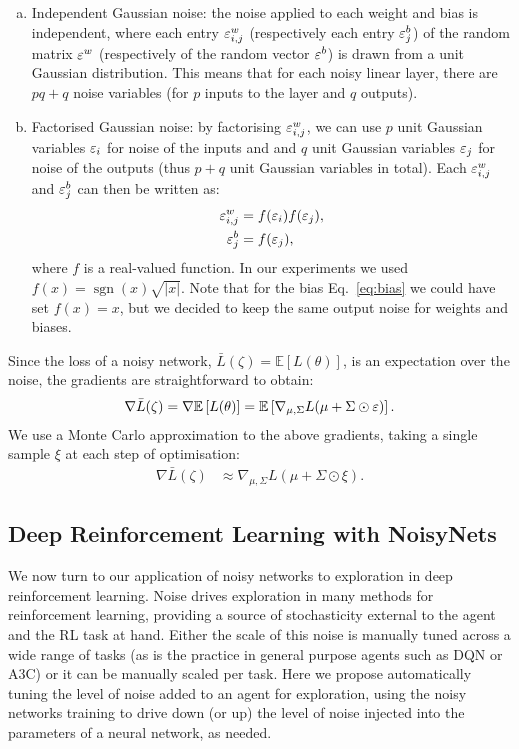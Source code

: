 \documentclass{article}
\newcommand{\sgn}{\operatorname*{sgn}}
\begin{document}
\begin{enumerate}[(a)]
    \item Independent Gaussian noise: the noise applied to each weight and bias is independent, where each entry $\varepsilon^w_{i,j}$ (respectively each entry $\varepsilon^b_j$) of the random matrix $\varepsilon^w$ (respectively of the random vector $\varepsilon^b$) is drawn from a unit Gaussian distribution.
    This means that for each noisy linear layer, there are $pq+q$ noise variables (for $p$ inputs to the layer and $q$ outputs).
    \item Factorised Gaussian noise: by factorising $\varepsilon^w_{i,j}$, we can use $p$ unit Gaussian variables $\varepsilon_i$ for noise of the inputs and
and $q$ unit Gaussian variables $\varepsilon_j$ for noise of the outputs (thus $p+q$ unit Gaussian variables in total). 
Each $\varepsilon^w_{i,j}$ and $\varepsilon^b_j$ can then be written as:
\begin{align}
\varepsilon^w_{i,j}& = f(\varepsilon_i)f(\varepsilon_j), \\
\varepsilon^b_j& = f(\varepsilon_j), \label{eq:bias}
\end{align}
where $f$ is a real-valued  function.
In our experiments we used $f(x) = \sgn(x)\sqrt{|x|}$. Note that for the bias Eq.~\eqref{eq:bias} we could have set $f(x)=x$, but we decided to keep the same output noise for weights and biases.
\end{enumerate}
Since the loss of a noisy network, $\bar L(\zeta) = \mathbb{E}\left[L(\theta)\right]$, is an expectation over the noise, the gradients are straightforward to obtain:
\begin{align}
\nabla \bar L(\zeta)= \nabla \mathbb{E}\left[L(\theta)\right]= \mathbb{E}\left[\nabla_{\mu,\Sigma} L(\mu + \Sigma\odot \varepsilon)\right].
\end{align}
We use a Monte Carlo approximation to the above gradients, taking a single sample $\xi$ at each step of optimisation:
\begin{align}
\nabla \bar L(\zeta) &\approx \nabla_{\mu,\Sigma} L(\mu + \Sigma\odot \xi).
\end{align}
\subsection{Deep Reinforcement Learning with NoisyNets}
\label{sec:Reinforcement Learning using Randomised Networks}
We now turn to our application of noisy networks to exploration in deep reinforcement learning.
Noise drives exploration in many methods for reinforcement learning, providing a source of stochasticity external to the agent and the RL task at hand.
Either the scale of this noise is manually tuned across a wide range of tasks (as is the practice in general purpose agents such as DQN or A3C) or it can be manually scaled per task.
Here we propose automatically tuning the level of noise added to an agent for exploration, using the noisy networks training to drive down (or up) the level of noise injected into the parameters of a neural network, as needed.
\end{document}
